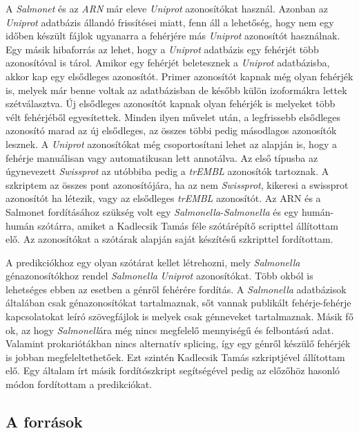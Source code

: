 \documentclass[a4paper,12pt]{article}
\begin{document}
			A \textit{Salmonet} és az \textit{ARN} már eleve \textit{Uniprot} azonosítókat használ. Azonban az \textit{Uniprot} adatbázis állandó frissítései miatt, fenn áll a lehetőség, hogy nem egy időben készült fájlok ugyanarra a fehérjére más \textit{Uniprot} azonosítót használnak. Egy másik hibaforrás az lehet, hogy a \textit{Uniprot} adatbázis egy fehérjét több azonosítóval is tárol. Amikor egy fehérjét beletesznek a \textit{Uniprot} adatbázisba, akkor kap egy elsődleges azonosítót. Primer azonosítót kapnak még olyan fehérjék is, melyek már benne voltak az adatbázisban de később külön izoformákra lettek szétválasztva. Új elsődleges azonosítót kapnak olyan fehérjék is melyeket több vélt fehérjéből egyesítettek. Minden ilyen művelet után, a legfrissebb elsődleges azonosító marad az új elsődleges, az összes többi pedig másodlagos azonosítók lesznek. A \textit{Uniprot} azonosítókat még csoportosítani lehet az alapján is, hogy a fehérje manuálisan vagy automatikusan lett annotálva. Az első típusba az úgynevezett \textit{Swissprot} az utóbbiba pedig a \textit{trEMBL} azonosítók tartoznak. A szkriptem az összes pont azonosítójára, ha az nem \textit{Swissprot}, kikeresi a swissprot azonosítót ha létezik, vagy az elsődleges \textit{trEMBL} azonosítót. Az ARN és a Salmonet fordításához szükség volt egy \textit{Salmonella}-\textit{Salmonella} és egy humán-humán szótárra, amiket a Kadlecsik Tamás féle szótárépítő scripttel állítottam elő. Az azonosítókat a szótárak alapján saját készítésű szkripttel fordítottam.
			
			A predikciókhoz egy olyan szótárat kellet létrehozni, mely \textit{Salmonella} génazonosítókhoz rendel \textit{Salmonella} \textit{Uniprot} azonosítókat. Több okból is lehetséges ebben az esetben a génről fehérére fordítás. A \textit{Salmonella} adatbázisok általában csak génazonosítókat tartalmaznak, sőt vannak publikált fehérje-fehérje kapcsolatokat leíró szövegfájlok is melyek csak génneveket tartalmaznak. Másik fő ok, az hogy \textit{Salmonell}ára még nincs megfelelő mennyiségű és felbontású adat. Valamint prokariótákban nincs alternatív splicing, így egy génről készülő fehérjék is jobban megfeleltethetőek. Ezt szintén Kadlecsik Tamás szkriptjével állítottam elő. Egy általam írt másik fordítószkript segítségével pedig az előzőhöz hasonló módon fordítottam a predikciókat.
			
			
		\subsection{A források}
\end{document}
